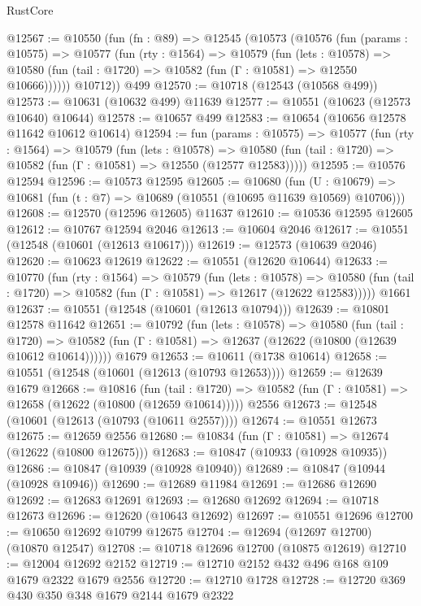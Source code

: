 \begin{lexlean}{RustCore}
\begin{coremodule}
@12567 := @10550
    (fun (fn : @89) =>
    @12545
      (@10573
        (@10576
          (fun (params : @10575) =>
          @10577
            (fun (rty : @1564) =>
            @10579
              (fun (lets : @10578) =>
              @10580 (fun (tail : @1720) => @10582 (fun (Γ : @10581) => @12550 @10666))))))
        @10712))
    @499
@12570 := @10718 (@12543 (@10568 @499))
@12573 := @10631 (@10632 @499) @11639
@12577 := @10551 (@10623 (@12573 @10640) @10644)
@12578 := @10657 @499
@12583 := @10654 (@10656 @12578 @11642 @10612 @10614)
@12594 := fun (params : @10575) =>
  @10577
    (fun (rty : @1564) =>
    @10579
      (fun (lets : @10578) =>
      @10580 (fun (tail : @1720) => @10582 (fun (Γ : @10581) => @12550 (@12577 @12583)))))
@12595 := @10576 @12594
@12596 := @10573 @12595
@12605 := @10680
    (fun (U : @10679) => @10681 (fun (t : @7) => @10689 (@10551 (@10695 @11639 @10569) @10706)))
@12608 := @12570 (@12596 @12605) @11637
@12610 := @10536 @12595 @12605
@12612 := @10767 @12594 @2046
@12613 := @10604 @2046
@12617 := @10551 (@12548 (@10601 (@12613 @10617)))
@12619 := @12573 (@10639 @2046)
@12620 := @10623 @12619
@12622 := @10551 (@12620 @10644)
@12633 := @10770
    (fun (rty : @1564) =>
    @10579
      (fun (lets : @10578) =>
      @10580 (fun (tail : @1720) => @10582 (fun (Γ : @10581) => @12617 (@12622 @12583)))))
    @1661
@12637 := @10551 (@12548 (@10601 (@12613 @10794)))
@12639 := @10801 @12578 @11642
@12651 := @10792
    (fun (lets : @10578) =>
    @10580
      (fun (tail : @1720) =>
      @10582 (fun (Γ : @10581) => @12637 (@12622 (@10800 (@12639 @10612 @10614))))))
    @1679
@12653 := @10611 (@1738 @10614)
@12658 := @10551 (@12548 (@10601 (@12613 (@10793 @12653))))
@12659 := @12639 @1679
@12668 := @10816
    (fun (tail : @1720) => @10582 (fun (Γ : @10581) => @12658 (@12622 (@10800 (@12659 @10614)))))
    @2556
@12673 := @12548 (@10601 (@12613 (@10793 (@10611 @2557))))
@12674 := @10551 @12673
@12675 := @12659 @2556
@12680 := @10834 (fun (Γ : @10581) => @12674 (@12622 (@10800 @12675)))
@12683 := @10847 (@10933 (@10928 @10935))
@12686 := @10847 (@10939 (@10928 @10940))
@12689 := @10847 (@10944 (@10928 @10946))
@12690 := @12689 @11984
@12691 := @12686 @12690
@12692 := @12683 @12691
@12693 := @12680 @12692
@12694 := @10718 @12673
@12696 := @12620 (@10643 @12692)
@12697 := @10551 @12696
@12700 := @10650 @12692 @10799 @12675
@12704 := @12694 (@12697 @12700) (@10870 @12547)
@12708 := @10718 @12696 @12700 (@10875 @12619)
@12710 := @12004 @12692 @2152
@12719 := @12710 @2152 @432 @496 @168 @109 @1679 @2322 @1679 @2556
@12720 := @12710 @1728
@12728 := @12720 @369 @430 @350 @348 @1679 @2144 @1679 @2322

\end{coremodule}
\end{lexlean}
